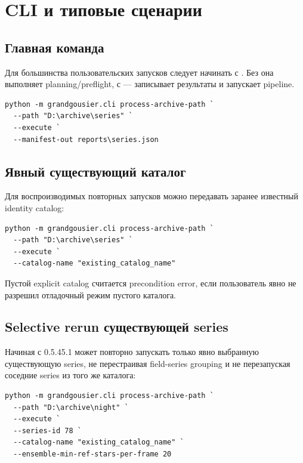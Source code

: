 \chapter{CLI и типовые сценарии}

\section{Главная команда}

Для большинства пользовательских запусков следует начинать с . Без  она выполняет planning/preflight, с  --- записывает результаты и запускает pipeline.

\begin{lstlisting}
python -m grandgousier.cli process-archive-path `
  --path "D:\archive\series" `
  --execute `
  --manifest-out reports\series.json
\end{lstlisting}

\section{Явный существующий каталог}

Для воспроизводимых повторных запусков можно передавать заранее известный identity catalog:

\begin{lstlisting}
python -m grandgousier.cli process-archive-path `
  --path "D:\archive\series" `
  --execute `
  --catalog-name "existing_catalog_name"
\end{lstlisting}

Пустой explicit catalog считается precondition error, если пользователь явно не разрешил отладочный режим пустого каталога.

\section{Selective rerun существующей series}

Начиная с 0.5.45.1  может повторно запускать только явно выбранную
существующую series, не перестраивая field-series grouping и не перезапуская соседние series из
того же каталога:

\begin{lstlisting}
python -m grandgousier.cli process-archive-path `
  --path "D:\archive\night" `
  --execute `
  --series-id 78 `
  --catalog-name "existing_catalog_name" `
  --ensemble-min-ref-stars-per-frame 20
\end{lstlisting}

